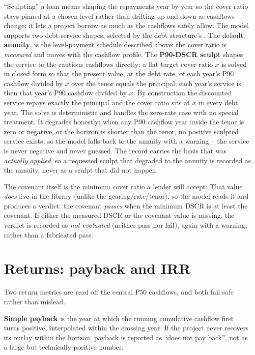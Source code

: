 \begin{plainnote}
``Sculpting'' a loan means shaping the repayments year by year so the cover ratio stays pinned at a chosen level rather than drifting up and down as cashflows change; it lets a project borrow as much as the cashflows safely allow. The model supports two debt-service shapes, selected by the debt structure's . The default, \textbf{annuity}, is the level-payment schedule described above: the cover ratio is \emph{measured} and moves with the cashflow profile. The \textbf{P90-DSCR sculpt} shapes the service to the cautious cashflows directly: a flat target cover ratio $x$ is solved in closed form so that the present value, at the debt rate, of each year's P90 cashflow divided by $x$ over the tenor equals the principal; each year's service is then that year's P90 cashflow divided by $x$. By construction the discounted service repays exactly the principal and the cover ratio sits at $x$ in every debt year. The solve is deterministic and handles the zero-rate case with no special treatment. It degrades honestly: when any P90 cashflow year inside the tenor is zero or negative, or the horizon is shorter than the tenor, no positive sculpted service exists, so the model falls back to the annuity with a warning -- the service is never negative and never guessed. The record carries the basis that was \emph{actually applied}, so a requested sculpt that degraded to the annuity is recorded as the annuity, never as a sculpt that did not happen.
\end{plainnote}

The covenant itself is the minimum cover ratio a lender will accept. That value \emph{does} live in the library (unlike the gearing/rate/tenor), so the model reads it and produces a verdict: the covenant \emph{passes} when the minimum DSCR is at least the covenant. If either the measured DSCR or the covenant value is missing, the verdict is recorded as \emph{not evaluated} (neither pass nor fail), again with a warning, rather than a fabricated pass.

\section{Returns: payback and IRR}

Two return metrics are read off the central P50 cashflows, and both fail safe rather than mislead.

\textbf{Simple payback} is the year at which the running cumulative cashflow first turns positive, interpolated within the crossing year. If the project never recovers its outlay within the horizon, payback is reported as ``does not pay back'', not as a large but technically-positive number.

